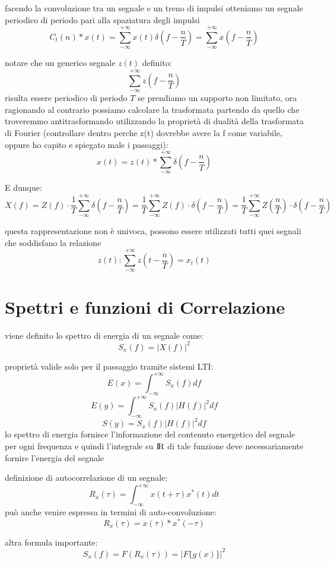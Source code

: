 \documentclass{article}
\begin{document}
facendo la convoluzione tra un segnale e un treno di impulsi otteniamo un segnale periodico di periodo pari alla spaziatura degli impulsi
$$C_t(n)*x(t) =
\sum_{-\infty}^{+\infty}x(t)\delta(f-\frac{n}{T}) =
\sum_{-\infty}^{+\infty}x(f-\frac{n}{T})$$

notare che un generico segnale $z(t)$ definito:
$$\sum_{-\infty}^{+\infty}z(f-\frac{n}{T})$$
risulta essere periodico di periodo $T$ se prendiamo un supporto non limitato,
ora ragionando al contrario possiamo calcolare la trasformata partendo da quello che
troveremmo antitrasformando utilizzando la proprietà di dualità della trasformata di
Fourier (controllare dentro perche z(t) dovrebbe avere la f come variabile, oppure ho capito e spiegato male i passaggi):
$$x(t) = z(t)*\sum_{-\infty}^{+\infty}\delta(f-\frac{n}{T})$$

E dunque:
$$X(f) = Z(f) \cdot \frac{1}{T}\sum_{-\infty}^{+\infty}\delta(f-\frac{n}{T}) =
\frac{1}{T}\sum_{-\infty}^{+\infty} Z(f) \cdot \delta(f-\frac{n}{T}) =
\frac{1}{T}\sum_{-\infty}^{+\infty} Z(\frac{n}{T}) \cdot \delta(f-\frac{n}{T})$$

questa rappresentazione non è univoca, possono essere utilizzati tutti quei segnali
che soddisfano la relazione
$$z(t):\sum_{-\infty}^{+\infty} z(t-\frac{n}{T}) = x_t(t)$$


\section{Spettri e funzioni di Correlazione}
viene definito lo spettro di energia di un segnale come:
$$S_x(f)=|X(f)|^2$$

proprietà valide solo per il passaggio tramite sistemi LTI:
$$E(x) = \int_{-\infty}^{+\infty} S_x(f)df$$
$$E(y) = \int_{-\infty}^{+\infty} S_x(f)|H(f)|^2df$$
$$S(y) = S_x(f)|H(f)|^2df$$
lo spettro di energia fornisce l'informazione del contenuto energetico del segnale per ogni frequenza
e quindi l'integrale su $\rm I\!R$ di tale funzione deve necessariamente fornire l'energia del segnale

definizione di autocorrelazione di un segnale:
$$R_x(\tau)=\int_{-\infty}^{+\infty} x(t + \tau)x^*(t)dt$$
può anche venire espressa in termini di auto-convoluzione:
$$R_x(\tau) = x(\tau)*x^*(-\tau)$$

altra formula importante:
$$S_x(f) = F(R_x(\tau)) = | F\{g(x)\}|^2$$
\end{document}
